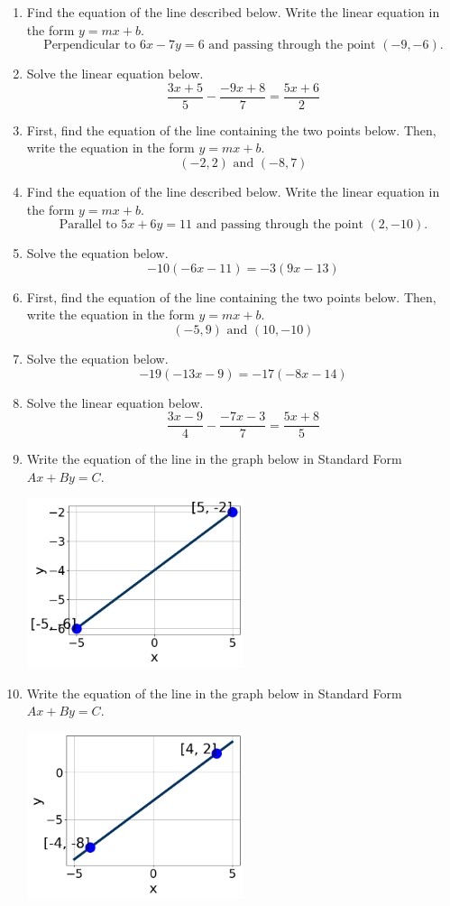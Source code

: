 \documentclass[14pt]{extbook}
\begin{document}
\begin{enumerate}
{\begin{center}
\end{center}
} \newpage
\item{
Find the equation of the line described below. Write the linear equation in the form $y=mx+b$.\[ \text{Perpendicular to } 6 x - 7 y = 6 \text{ and passing through the point } (-9, -6). \]} \newpage
\item{
Solve the linear equation below.\[ \frac{3x + 5}{5} - \frac{-9x + 8}{7} = \frac{5x + 6}{2} \]} \newpage
\item{
First, find the equation of the line containing the two points below. Then, write the equation in the form $ y=mx+b $.\[ (-2, 2) \text{ and } (-8, 7) \]} \newpage
\item{
Find the equation of the line described below. Write the linear equation in the form $y=mx+b$.\[ \text{Parallel to } 5 x + 6 y = 11 \text{ and passing through the point } (2, -10). \]} \newpage
\item{
Solve the equation below.\[ -10(-6x -11) = -3(9x -13) \]} \newpage
\item{
First, find the equation of the line containing the two points below. Then, write the equation in the form $ y=mx+b $.\[ (-5, 9) \text{ and } (10, -10) \]} \newpage
\item{
Solve the equation below.\[ -19(-13x -9) = -17(-8x -14) \]} \newpage
\item{
Solve the linear equation below.\[ \frac{3x -9}{4} - \frac{-7x -3}{7} = \frac{5x + 8}{5} \]} \newpage
\item{
Write the equation of the line in the graph below in Standard Form $Ax+By=C$.
\begin{center}
    \includegraphics[width=0.5\textwidth]{../Figures/linearGraphToStandardB.png}
\end{center}
} \newpage
\item{
Write the equation of the line in the graph below in Standard Form $Ax+By=C$.
\begin{center}
    \includegraphics[width=0.5\textwidth]{../Figures/linearGraphToStandardCopyB.png}

\end{center}}
\end{enumerate}
\end{document}

